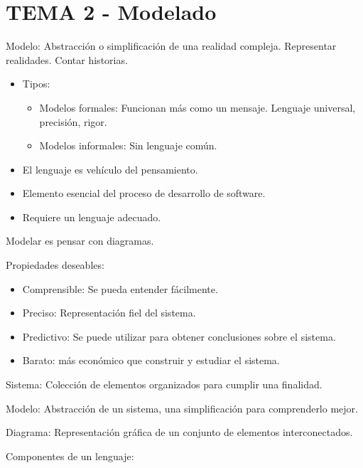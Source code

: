 \documentclass[12pt, twoside, openright]{report} %
\begin{document}
\chapter{TEMA 2 - Modelado}


    Modelo: Abstracción o simplificación de una realidad compleja.
    Representar realidades. Contar historias.

    \begin{itemize}
    
    \item
      Tipos:

      \begin{itemize}
      
      \item
        Modelos formales: Funcionan más como un mensaje. Lenguaje
        universal, precisión, rigor.
      \item
        Modelos informales: Sin lenguaje común.
      \end{itemize}
    \item
      El lenguaje es vehículo del pensamiento.
    \item
      Elemento esencial del proceso de desarrollo de software.
    \item
      Requiere un lenguaje adecuado.
    \end{itemize}

	Modelar es pensar con diagramas.

	Propiedades deseables:

    \begin{itemize}
    
    \item
      Comprensible: Se pueda entender fácilmente.
    \item
      Preciso: Representación fiel del sistema.
    \item
      Predictivo: Se puede utilizar para obtener conclusiones sobre el
      sistema.
    \item
      Barato: más económico que construir y estudiar el sistema.
    \end{itemize}

	Sistema: Colección de elementos organizados para cumplir una
    finalidad.

	Modelo: Abstracción de un sistema, una simplificación para
    comprenderlo mejor.

	Diagrama: Representación gráfica de un conjunto de elementos
    interconectados.

	Componentes de un lenguaje:
\end{document}
